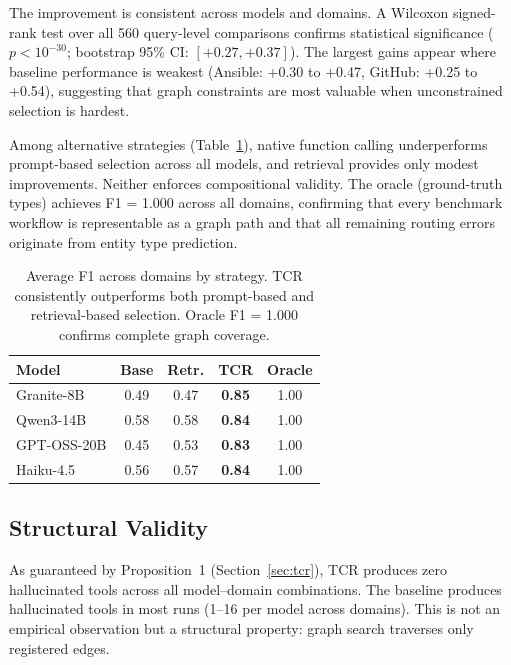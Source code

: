 The improvement is consistent across models and domains.
A Wilcoxon signed-rank test over all 560 query-level comparisons confirms statistical significance ($p < 10^{-30}$; bootstrap 95\% CI: $[+0.27, +0.37]$).
The largest gains appear where baseline performance is weakest (Ansible: +0.30 to +0.47, GitHub: +0.25 to +0.54), suggesting that graph constraints are most valuable when unconstrained selection is hardest.

Among alternative strategies (Table~\ref{tab:strategy-comparison}), native function calling underperforms prompt-based selection across all models, and retrieval provides only modest improvements.
Neither enforces compositional validity.
The oracle (ground-truth types) achieves F1 = 1.000 across all domains, confirming that every benchmark workflow is representable as a graph path and that all remaining routing errors originate from entity type prediction.

\begin{table}[t]
\centering
\small
\begin{tabular}{l cccc}
\toprule
\textbf{Model} & \textbf{Base} & \textbf{Retr.} & \textbf{TCR} & \textbf{Oracle} \\
\midrule
Granite-8B  & 0.49 & 0.47 & \textbf{0.85} & 1.00 \\
Qwen3-14B   & 0.58 & 0.58 & \textbf{0.84} & 1.00 \\
GPT-OSS-20B & 0.45 & 0.53 & \textbf{0.83} & 1.00 \\
Haiku-4.5   & 0.56 & 0.57 & \textbf{0.84} & 1.00 \\
\bottomrule
\end{tabular}
\caption{Average F1 across domains by strategy. TCR consistently outperforms both prompt-based and retrieval-based selection. Oracle F1 = 1.000 confirms complete graph coverage.}
\label{tab:strategy-comparison}
\end{table}

\subsection{Structural Validity}
\label{sec:structural-validity}

As guaranteed by Proposition~1 (Section~\ref{sec:tcr}), TCR produces zero hallucinated tools across all model--domain combinations.
The baseline produces hallucinated tools in most runs (1--16 per model across domains).
This is not an empirical observation but a structural property: graph search traverses only registered edges.

